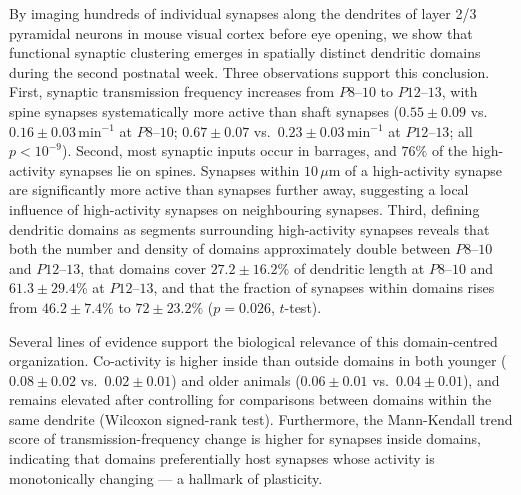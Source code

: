 \documentclass[11pt]{article}
\begin{document}
By imaging hundreds of individual synapses along the dendrites of layer 2/3 pyramidal neurons in mouse visual cortex before eye opening, we show that functional synaptic clustering emerges in spatially distinct dendritic domains during the second postnatal week. Three observations support this conclusion. First, synaptic transmission frequency increases from $P8$--$10$ to $P12$--$13$, with spine synapses systematically more active than shaft synapses ($0.55 \pm 0.09$ vs.\ $0.16 \pm 0.03$\,min$^{-1}$ at $P8$--$10$; $0.67 \pm 0.07$ vs.\ $0.23 \pm 0.03$\,min$^{-1}$ at $P12$--$13$; all $p < 10^{-9}$). Second, most synaptic inputs occur in barrages, and $76\%$ of the high-activity synapses lie on spines. Synapses within $10\,\mu\mathrm{m}$ of a high-activity synapse are significantly more active than synapses further away, suggesting a local influence of high-activity synapses on neighbouring synapses. Third, defining dendritic domains as segments surrounding high-activity synapses reveals that both the number and density of domains approximately double between $P8$--$10$ and $P12$--$13$, that domains cover $27.2 \pm 16.2\%$ of dendritic length at $P8$--$10$ and $61.3 \pm 29.4\%$ at $P12$--$13$, and that the fraction of synapses within domains rises from $46.2 \pm 7.4\%$ to $72 \pm 23.2\%$ ($p = 0.026$, $t$-test).

Several lines of evidence support the biological relevance of this domain-centred organization. Co-activity is higher inside than outside domains in both younger ($0.08 \pm 0.02$ vs.\ $0.02 \pm 0.01$) and older animals ($0.06 \pm 0.01$ vs.\ $0.04 \pm 0.01$), and remains elevated after controlling for comparisons between domains within the same dendrite (Wilcoxon signed-rank test). Furthermore, the Mann-Kendall trend score of transmission-frequency change is higher for synapses inside domains, indicating that domains preferentially host synapses whose activity is monotonically changing --- a hallmark of plasticity.
\end{document}
